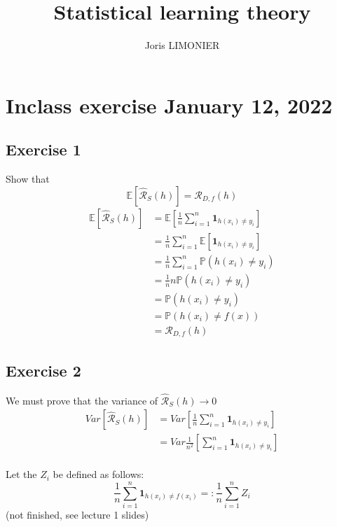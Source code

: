 \documentclass{article}
\title{Statistical learning theory}
\author{Joris LIMONIER}
\newcommand{\1}{\mathbf{1}}
\newcommand{\E}{\mathbb{E}}
\renewcommand{\P}{\mathbb{P}}
\begin{document}
\maketitle

\tableofcontents

\section{Inclass exercise January 12, 2022}
\subsection{Exercise 1}
Show that
\begin{equation}
  \E \left[ \hat{\mathcal{R}}_S (h) \right] = \mathcal{R}_{D, f} (h)
\end{equation}
\begin{align*}
  \E \left[ \hat{\mathcal{R}}_S (h) \right]
   & = \E \left[ \frac{1}{n} \sum_{i=1}^n \mathbf{1}_{h(x_i) \neq y_i} \right] \\
   & = \frac{1}{n} \sum_{i=1}^n \E \left[ \mathbf{1}_{h(x_i) \neq y_i} \right] \\
   & = \frac{1}{n} \sum_{i=1}^n \P \left(h(x_i) \neq y_i \right)               \\
   & = \frac{1}{n} n  \P \left(h(x_i) \neq y_i \right)                         \\
   & = \P \left(h(x_i) \neq y_i \right)                                        \\
   & = \P \left(h(x_i) \neq f(x) \right)                                       \\
   & = \mathcal{R}_{D, f} (h)
\end{align*}

\subsection{Exercise 2}
We must prove that the variance of \(\hat{\mathcal{R}}_S (h) \to 0\)
\begin{align*}
  Var \left[ \hat{\mathcal{R}}_S (h) \right]
   & = Var \left[ \frac{1}{n} \sum_{i=1}^n \mathbf{1}_{h(x_i) \neq y_i} \right]   \\
   & = Var \frac{1}{n^2} \left[ \sum_{i=1}^n \mathbf{1}_{h(x_i) \neq y_i} \right] \\
\end{align*}

Let the \(Z_i\) be defined as follows:
\[\frac{1}{n} \sum_{i=1}^{n} \mathbf{1}_{h(x_i) \neq f(x_i)} =: \frac{1}{n} \sum_{i=1}^{n} Z_i\]
(not finished, see lecture 1 slides)
\end{document}
